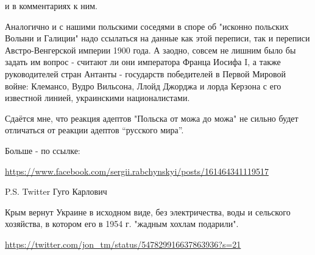 \begin{itemize}
и в комментариях к ним.

Аналогично и с нашими польскими соседями в споре об "исконно польских Волыни и
Галиции" надо ссылаться на данные как этой переписи, так и переписи
Австро-Венгерской империи 1900 года. А заодно, совсем не лишним было бы задать
им вопрос - считают ли они императора Франца Иосифа I, а также руководителей
стран Антанты - государств победителей в Первой Мировой войне: Клемансо, Вудро
Вильсона, Ллойд Джорджа и лорда Керзона с его известной линией, украинскими
националистами.

Сдаётся мне, что реакция адептов "Польска от можа до можа" не сильно будет
отличаться от реакции адептов \enquote{русского мира}.

Больше - по ссылке: 

\url{https://www.facebook.com/sergii.rabchynskyi/posts/161464341119517}

P.S. Twitter Гуго Карлович

Крым вернут Украине в исходном виде, без электричества, воды и сельского
хозяйства, в котором его в 1954 г. "жадным хохлам подарили".

\url{https://twitter.com/jon_tm/status/547829916637863936?s=21}

\end{itemize}


